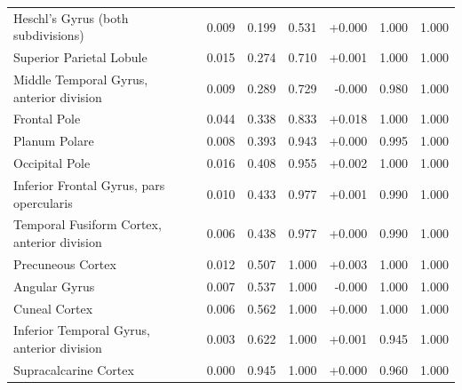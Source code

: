 \documentclass[11pt]{article}
\begin{document}
{\begin{longtable}{>{\raggedright\arraybackslash}p{6.4cm}rrrrrr}
Heschl's Gyrus (both subdivisions) & 0.009 & 0.199 & 0.531 & +0.000 & 1.000 & 1.000 \\
Superior Parietal Lobule & 0.015 & 0.274 & 0.710 & +0.001 & 1.000 & 1.000 \\
Middle Temporal Gyrus, anterior division & 0.009 & 0.289 & 0.729 & -0.000 & 0.980 & 1.000 \\
Frontal Pole & 0.044 & 0.338 & 0.833 & +0.018 & 1.000 & 1.000 \\
Planum Polare & 0.008 & 0.393 & 0.943 & +0.000 & 0.995 & 1.000 \\
Occipital Pole & 0.016 & 0.408 & 0.955 & +0.002 & 1.000 & 1.000 \\
Inferior Frontal Gyrus, pars opercularis & 0.010 & 0.433 & 0.977 & +0.001 & 0.990 & 1.000 \\
Temporal Fusiform Cortex, anterior division & 0.006 & 0.438 & 0.977 & +0.000 & 0.990 & 1.000 \\
Precuneous Cortex & 0.012 & 0.507 & 1.000 & +0.003 & 1.000 & 1.000 \\
Angular Gyrus & 0.007 & 0.537 & 1.000 & -0.000 & 1.000 & 1.000 \\
Cuneal Cortex & 0.006 & 0.562 & 1.000 & +0.000 & 1.000 & 1.000 \\
Inferior Temporal Gyrus, anterior division & 0.003 & 0.622 & 1.000 & +0.001 & 0.945 & 1.000 \\
Supracalcarine Cortex & 0.000 & 0.945 & 1.000 & +0.000 & 0.960 & 1.000 \\
\end{longtable}

}
\end{document}
